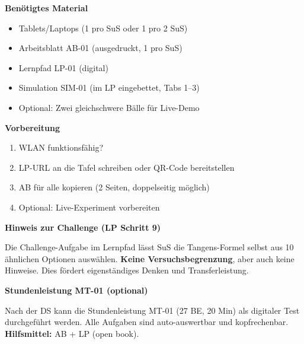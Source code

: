 \documentclass[10pt, a4paper]{article}
\newcommand{\fachfarbe}{physik}
\newcommand{\abschnitt}[1]{%
    \vspace{8pt}
    \noindent\textbf{\textcolor{\fachfarbe}{#1}}
    \vspace{4pt}
}
\begin{document}
\vspace{8pt}


\abschnitt{Benötigtes Material}

\begin{itemize}[nosep]
    \item Tablets/Laptops (1 pro SuS oder 1 pro 2 SuS)
    \item Arbeitsblatt AB-01 (ausgedruckt, 1 pro SuS)
    \item Lernpfad LP-01 (digital)
    \item Simulation SIM-01 (im LP eingebettet, Tabs 1--3)
    \item Optional: Zwei gleichschwere Bälle für Live-Demo
\end{itemize}

\vspace{8pt}

\abschnitt{Vorbereitung}

\begin{enumerate}[nosep]
    \item WLAN funktionsfähig?
    \item LP-URL an die Tafel schreiben oder QR-Code bereitstellen
    \item AB für alle kopieren (2 Seiten, doppelseitig möglich)
    \item Optional: Live-Experiment vorbereiten
\end{enumerate}

\vspace{8pt}

\abschnitt{Hinweis zur Challenge (LP Schritt 9)}

Die Challenge-Aufgabe im Lernpfad lässt SuS die Tangens-Formel selbst aus 10 ähnlichen Optionen auswählen. \textbf{Keine Versuchsbegrenzung}, aber auch keine Hinweise. Dies fördert eigenständiges Denken und Transferleistung.

\vspace{8pt}

\abschnitt{Stundenleistung MT-01 (optional)}

Nach der DS kann die Stundenleistung MT-01 (27 BE, 20 Min) als digitaler Test durchgeführt werden. Alle Aufgaben sind auto-auswertbar und kopfrechenbar. \textbf{Hilfsmittel:} AB + LP (open book).
\end{document}
